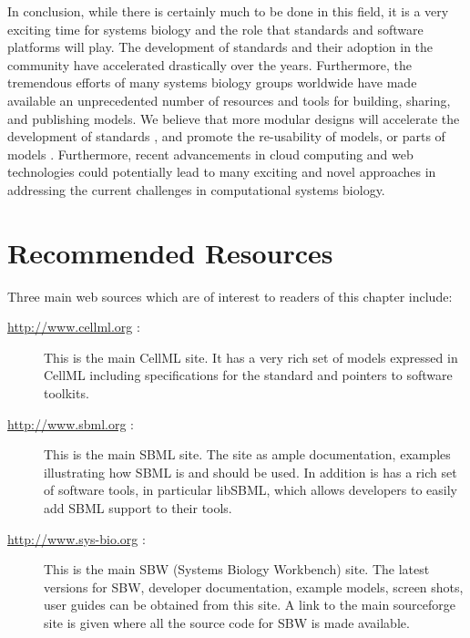 In conclusion, while there is certainly much to be done in this field,
it is a very exciting time for systems biology and the role that
standards and software platforms will play. The development of standards
and their adoption in the community have accelerated drastically over
the years. Furthermore, the tremendous efforts of many systems biology
groups worldwide have made available an unprecedented number of
resources and tools for building, sharing, and publishing models. We
believe that more modular designs will accelerate the development of
standards \autocite{hucka2010systems}, and promote the re-usability of
models, or parts of models \autocite{neal2012sbml}. Furthermore, recent
advancements in cloud computing and web technologies could potentially
lead to many exciting and novel approaches in addressing the current
challenges in computational systems biology.

\section{Recommended Resources}

Three main web sources which are of interest to readers of this chapter
include:

\begin{description}
\item[\url{http://www.cellml.org} :]
This is the main CellML site. It has a very rich set of models expressed
in CellML including specifications for the standard and pointers to
software toolkits.

\item[\url{http://www.sbml.org} :]
This is the main SBML site. The site as ample documentation, examples
illustrating how SBML is and should be used. In addition is has a rich
set of software tools, in particular libSBML, which allows developers to
easily add SBML support to their tools.

\item[\url{http://www.sys-bio.org} :]
This is the main SBW (Systems Biology Workbench) site. The latest
versions for SBW, developer documentation, example models, screen shots,
user guides can be obtained from this site. A link to the main
sourceforge site is given where all the source code for SBW is made
available.

\end{description}
